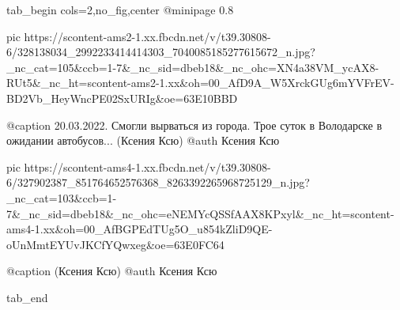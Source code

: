  
 
 
 
 


\ifcmt
  tab_begin cols=2,no_fig,center
     @minipage 0.8

     pic https://scontent-ams2-1.xx.fbcdn.net/v/t39.30808-6/328138034_2992233414414303_7040085185277615672_n.jpg?_nc_cat=105&ccb=1-7&_nc_sid=dbeb18&_nc_ohc=XN4a38VM_ycAX8-RUt5&_nc_ht=scontent-ams2-1.xx&oh=00_AfD9A_W5XrckGUg6mYVFrEV-BD2Vb_HeyWncPE02SxURIg&oe=63E10BBD

     @caption 20.03.2022. Смогли вырваться из города. Трое суток в Володарске в ожидании автобусов... (Ксения Ксю)
     @auth Ксения Ксю

     pic https://scontent-ams4-1.xx.fbcdn.net/v/t39.30808-6/327902387_851764652576368_8263392265968725129_n.jpg?_nc_cat=103&ccb=1-7&_nc_sid=dbeb18&_nc_ohc=eNEMYcQSSfAAX8KPxyl&_nc_ht=scontent-ams4-1.xx&oh=00_AfBGPEdTUg5O_u854kZliD9QE-oUnMmtEYUvJKCfYQwxeg&oe=63E0FC64

     @caption (Ксения Ксю)
     @auth Ксения Ксю

  tab_end
\fi
